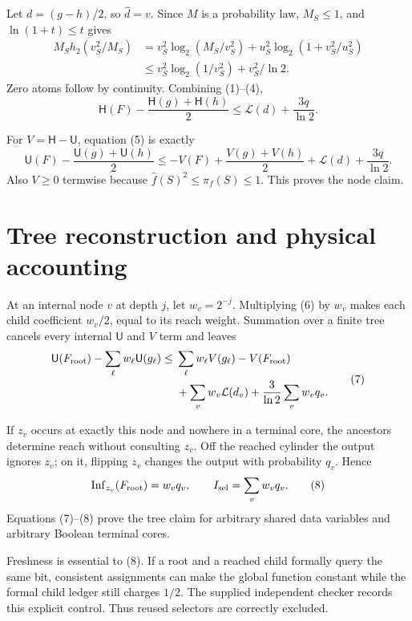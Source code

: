 \documentclass[11pt]{article}
\newcommand{\cH}{\mathsf H}
\newcommand{\cU}{\mathsf U}
\begin{document}
Let $d=(g-h)/2$, so $\widehat d=v$.  Since $M$ is a probability law,
$M_S\leq1$, and $\ln(1+t)\leq t$ gives
\[
 \begin{aligned}
 M_Sh_2(v_S^2/M_S)
 &=v_S^2\log_2(M_S/v_S^2)
   +u_S^2\log_2(1+v_S^2/u_S^2)\\
 &\leq v_S^2\log_2(1/v_S^2)+v_S^2/\ln2.
 \end{aligned}                                          \tag{4}
\]
Zero atoms follow by continuity.  Combining (1)--(4),
\[
 \cH(F)-\frac{\cH(g)+\cH(h)}2
 \leq \mathcal L(d)+\frac{3q}{\ln2}.                   \tag{5}
\]

For $V=\cH-\cU$, equation (5) is exactly
\[
 \cU(F)-\frac{\cU(g)+\cU(h)}2
 \leq -V(F)+\frac{V(g)+V(h)}2
       +\mathcal L(d)+\frac{3q}{\ln2}.                 \tag{6}
\]
Also $V\geq0$ termwise because
$\widehat f(S)^2\leq\pi_f(S)\leq1$.  This proves the node claim.

\section{Tree reconstruction and physical accounting}

At an internal node $v$ at depth $j$, let $w_v=2^{-j}$.  Multiplying (6) by
$w_v$ makes each child coefficient $w_v/2$, equal to its reach weight.
Summation over a finite tree cancels every internal $\cU$ and $V$ term and
leaves
\begin{equation}
\begin{split}
 \cU(F_{\rm root})-\sum_\ell w_\ell\cU(g_\ell)
 \leq{}&\sum_\ell w_\ell V(g_\ell)-V(F_{\rm root})\\
 &+\sum_vw_v\mathcal L(d_v)+\frac3{\ln2}\sum_vw_vq_v.
\end{split}
\tag{7}
\end{equation}

If $z_v$ occurs at exactly this node and nowhere in a terminal core, the
ancestors determine reach without consulting $z_v$.  Off the reached cylinder
the output ignores $z_v$; on it, flipping $z_v$ changes the output with
probability $q_v$.  Hence
\[
 \operatorname{Inf}_{z_v}(F_{\rm root})=w_vq_v,
 \qquad I_{\rm sel}=\sum_vw_vq_v.                       \tag{8}
\]
Equations (7)--(8) prove the tree claim for arbitrary shared data variables
and arbitrary Boolean terminal cores.

Freshness is essential to (8).  If a root and a reached child formally query
the same bit, consistent assignments can make the global function constant
while the formal child ledger still charges $1/2$.  The supplied independent
checker records this explicit control.  Thus reused selectors are correctly
excluded.
\end{document}
